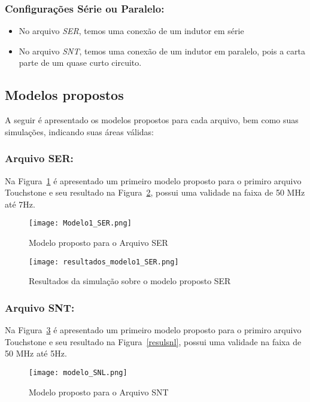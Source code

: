 \documentclass[a4paper,12pt]{proc}
\begin{document}
\subsubsection{Configurações Série ou Paralelo:}
\begin{itemize}
    \item No arquivo \textit{SER}, temos uma conexão de um indutor em série
    \item No arquivo \textit{SNT}, temos uma conexão de um indutor em paralelo, pois a carta parte de um quase curto circuito.
\end{itemize}

\subsection{Modelos propostos}

A seguir é apresentado os modelos propostos para cada arquivo, bem como suas simulações, indicando suas áreas válidas:

\subsubsection{Arquivo SER:}

Na Figura~\ref{modelser} é apresentado um primeiro modelo proposto para o primiro arquivo Touchstone e seu resultado na Figura~\ref{resulSer}, possui uma validade na faixa de 50 MHz até 7Hz.

\begin{figure}[htbp]
    \centering
    \texttt{[image: Modelo1\_SER.png]}
    \caption{Modelo proposto para o Arquivo SER}
    \label{modelser}
\end{figure}

\begin{figure}[htbp]
    \centering
    \texttt{[image: resultados\_modelo1\_SER.png]}
    \caption{Resultados da simulação sobre o modelo proposto SER}
    \label{resulSer}
\end{figure}

\subsubsection{Arquivo SNT:}

Na Figura~\ref{modelsnl} é apresentado um primeiro modelo proposto para o primiro arquivo Touchstone e seu resultado na Figura~\ref{resulsnl}, possui uma validade na faixa de 50 MHz até 5Hz.

\begin{figure}[htbp]
    \centering
    \texttt{[image: modelo\_SNL.png]}
    \caption{Modelo proposto para o Arquivo SNT}
    \label{modelsnl}
\end{figure}
\end{document}
